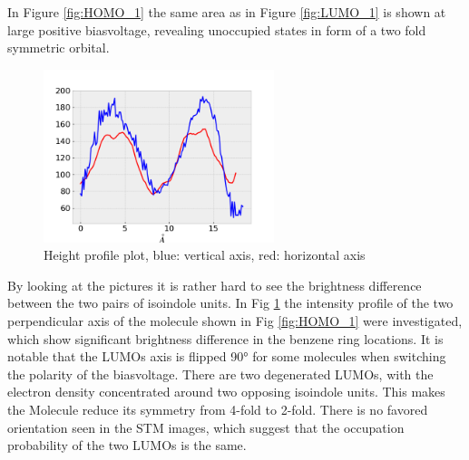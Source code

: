 \noindent In Figure \ref{fig:HOMO_1} the same area as in Figure \ref{fig:LUMO_1} is shown at large positive biasvoltage, revealing unoccupied states in form of a two fold symmetric orbital.
\begin{figure}
    \centering
    \includegraphics[width=0.6\textwidth]{graphics/ready_images_phthalo/profile_plot_2Hpc_on_Ag.png}
    \caption{
        Height profile plot,
        blue: vertical axis,
        red: horizontal axis}
    \label{fig:intensityAg}
\end{figure}
By looking at the pictures it is rather hard to see the brightness difference between the two pairs of isoindole units. 
In Fig \ref{fig:intensityAg} the intensity profile of the two perpendicular axis of the molecule shown in Fig \ref{fig:HOMO_1} were investigated, which show significant brightness difference in the benzene ring locations.
It is notable that the LUMOs axis is flipped 90° for some molecules when switching the polarity of the biasvoltage.
There are two degenerated LUMOs, with the electron density concentrated around two opposing isoindole units. 
This makes the Molecule reduce its symmetry from 4-fold to 2-fold.
There is no favored orientation seen in the STM images, which suggest that the occupation probability of the two LUMOs is the same. 



